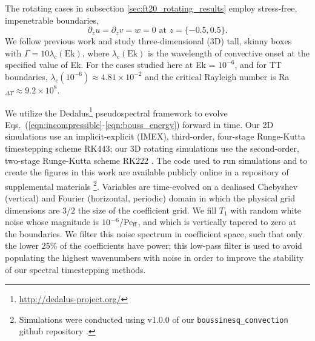 The rotating cases in subsection \ref{sec:ft20_rotating_results} employ stress-free, impenetrable boundaries,
\begin{equation}
\partial_z u = \partial_z v = w = 0 \, \, \text{at}\,\,z = \{-0.5, 0.5\}.
\label{eqn:vel_bcs}
\end{equation}
We follow previous work  \citep{stellmach&all2014} and study three-dimensional (3D) tall, skinny boxes with $\Gamma = 10\lambda_c(\text{Ek})$, where $\lambda_c(\text{Ek})$ is the wavelength of convective onset at the specified value of Ek. 
For the cases studied here at Ek = $10^{-6}$, and for TT boundaries, $\lambda_c(10^{-6}) \approx 4.81 \times 10^{-2}$ and the critical Rayleigh number is Ra$_{\Delta T} \approx 9.2 \times 10^{8}$.

We utilize the Dedalus\footnote{\url{http://dedalus-project.org/}} pseudospectral framework \citep{burns&all2016, burns&all2019} to evolve Eqs.~(\ref{eqn:incompressible}-\ref{eqn:bouss_energy}) forward in time.
Our 2D simulations use an implicit-explicit (IMEX), third-order, four-stage Runge-Kutta timestepping scheme RK443; our 3D rotating simulations use the second-order, two-stage Runge-Kutta scheme RK222 \citep{ascher&all1997}. 
The code used to run simulations and to create the figures in this work are available publicly online in a repository of supplemental materials \citep{anders&all2020a_supp}\footnote{Simulations were conducted using v1.0.0 of our \texttt{boussinesq\_convection} github repository \citep{code:boussinesq_convection}.}.
Variables are time-evolved on a dealiased Chebyshev (vertical) and Fourier (horizontal, periodic) domain in which the physical grid dimensions are 3/2 the size of the coefficient grid.  
We fill $T_1$ with random white noise whose magnitude is $10^{-6}/\text{Pe}_{\text{ff}}$, and which is vertically tapered to zero at the boundaries.
We filter this noise spectrum in coefficient space, such that only the lower 25\% of the coefficients have power; this low-pass filter is used to avoid populating the highest wavenumbers with noise in order to improve the stability of our spectral timestepping methods.


